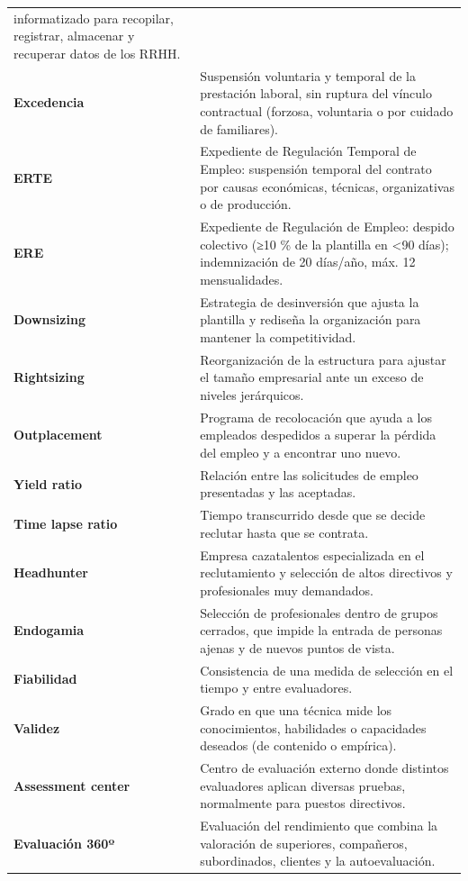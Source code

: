 \documentclass[12pt]{book} %
\begin{document}
\begin{longtable}[]{@{}
  >{\raggedright\arraybackslash}p{}
  >{\raggedright\arraybackslash}p{}@{}}
informatizado para recopilar, registrar, almacenar y recuperar datos de
los RRHH. \\
\textbf{Excedencia} & Suspensión voluntaria y temporal de la prestación
laboral, sin ruptura del vínculo contractual (forzosa, voluntaria o por
cuidado de familiares). \\
\textbf{ERTE} & Expediente de Regulación Temporal de Empleo: suspensión
temporal del contrato por causas económicas, técnicas, organizativas o
de producción. \\
\textbf{ERE} & Expediente de Regulación de Empleo: despido colectivo
(≥10 \% de la plantilla en \textless90 días); indemnización de 20
días/año, máx. 12 mensualidades. \\
\textbf{Downsizing} & Estrategia de desinversión que ajusta la plantilla
y rediseña la organización para mantener la competitividad. \\
\textbf{Rightsizing} & Reorganización de la estructura para ajustar el
tamaño empresarial ante un exceso de niveles jerárquicos. \\
\textbf{Outplacement} & Programa de recolocación que ayuda a los
empleados despedidos a superar la pérdida del empleo y a encontrar uno
nuevo. \\
\textbf{Yield ratio} & Relación entre las solicitudes de empleo
presentadas y las aceptadas. \\
\textbf{Time lapse ratio} & Tiempo transcurrido desde que se decide
reclutar hasta que se contrata. \\
\textbf{Headhunter} & Empresa cazatalentos especializada en el
reclutamiento y selección de altos directivos y profesionales muy
demandados. \\
\textbf{Endogamia} & Selección de profesionales dentro de grupos
cerrados, que impide la entrada de personas ajenas y de nuevos puntos de
vista. \\
\textbf{Fiabilidad} & Consistencia de una medida de selección en el
tiempo y entre evaluadores. \\
\textbf{Validez} & Grado en que una técnica mide los conocimientos,
habilidades o capacidades deseados (de contenido o empírica). \\
\textbf{Assessment center} & Centro de evaluación externo donde
distintos evaluadores aplican diversas pruebas, normalmente para puestos
directivos. \\
\textbf{Evaluación 360º} & Evaluación del rendimiento que combina la
valoración de superiores, compañeros, subordinados, clientes y la
autoevaluación. \\

\end{longtable}
\end{document}
